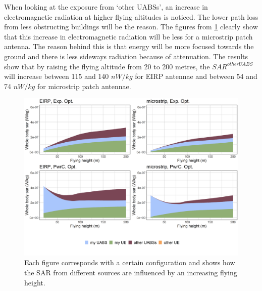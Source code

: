 When looking at the exposure from `other \gls{UABS}s', an increase in electromagnetic radiation at higher 
flying altitudes is noticed.
The lower path loss from less obstructing buildings will be the reason.
The figures from \ref{fig:s3a_fourSourcesMatrix} clearly show that this increase 
in electromagnetic radiation will be less for a microstrip patch antenna. The reason behind this is that energy 
will be more focused towards the ground and there is less sideways radiation because of attenuation.
The results show that by raising the flying altitude from 20 to 200 metres,
the $SAR^{otherUABS}$ will increase between 115 and 140 $nW/kg$ for \gls{EIRP} antennae and between 54 and 74 $nW/kg$ for microstrip patch antennae.
\clearpage
\begin{figure}[]
\centering
  \includegraphics[width=\textwidth]{../results/s3/fhFourSources.png}
  \caption{
  Each figure corresponds with a certain configuration and shows how the \acs{SAR} from different sources are influenced by an increasing flying height.}  
  \label{fig:s3a_fourSourcesMatrix}
\end{figure}

\FloatBarrier
